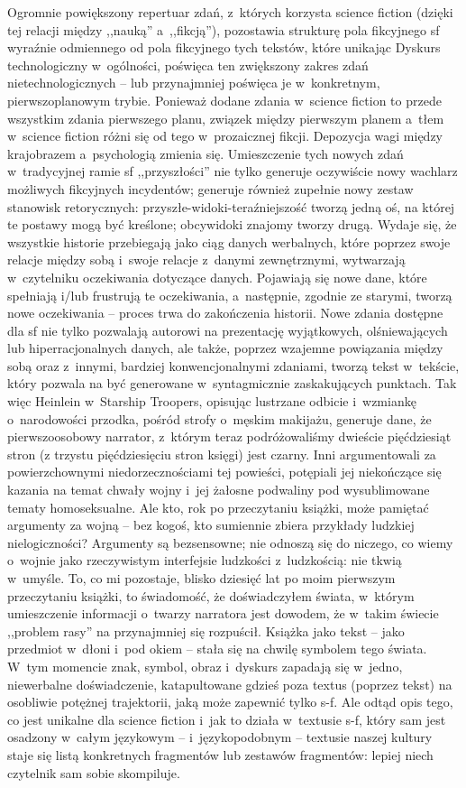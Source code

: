\documentclass[oneside,polish,11pt,rmheadings]{mwbk}
\begin{document}
Ogromnie powiększony repertuar zdań, z~których korzysta science fiction (dzięki tej relacji między ,,nauką'' a~,,fikcją''), pozostawia strukturę pola fikcyjnego sf wyraźnie odmiennego od pola fikcyjnego tych tekstów, które unikając Dyskurs technologiczny w~ogólności, poświęca ten zwiększony zakres zdań nietechnologicznych -- lub przynajmniej poświęca je w~konkretnym, pierwszoplanowym trybie. Ponieważ dodane zdania w~science fiction to przede wszystkim zdania pierwszego planu, związek między pierwszym planem a~tłem w~science fiction różni się od tego w~prozaicznej fikcji. Depozycja wagi między krajobrazem a~psychologią zmienia się. Umieszczenie tych nowych zdań w~tradycyjnej ramie sf ,,przyszłości'' nie tylko generuje oczywiście nowy wachlarz możliwych fikcyjnych incydentów; generuje również zupełnie nowy zestaw stanowisk retorycznych: przyszłe-widoki-teraźniejszość tworzą jedną oś, na której te postawy mogą być kreślone; obcy\dywiz widoki \dywiz znajomy tworzy drugą. Wydaje się, że wszystkie historie przebiegają jako ciąg danych werbalnych, które poprzez swoje relacje między sobą i~swoje relacje z~danymi zewnętrznymi, wytwarzają w~czytelniku oczekiwania dotyczące danych. Pojawiają się nowe dane, które spełniają i/lub frustrują te oczekiwania, a~następnie, zgodnie ze starymi, tworzą nowe oczekiwania -- proces trwa do zakończenia historii. Nowe zdania dostępne dla sf nie tylko pozwalają autorowi na prezentację wyjątkowych, olśniewających lub hiperracjonalnych danych, ale także, poprzez wzajemne powiązania między sobą oraz z~innymi, bardziej konwencjonalnymi zdaniami, tworzą tekst w~tekście, który pozwala na być generowane w~syntagmicznie zaskakujących punktach. Tak więc Heinlein w~Starship Troopers, opisując lustrzane odbicie i~wzmiankę o~narodowości przodka, pośród strofy o~męskim makijażu, generuje dane, że pierwszoosobowy narrator, z~którym teraz podróżowaliśmy dwieście pięćdziesiąt stron (z trzystu pięćdziesięciu stron księgi) jest czarny. Inni argumentowali za powierzchownymi niedorzecznościami tej powieści, potępiali jej niekończące się kazania na temat chwały wojny i~jej żałosne podwaliny pod wysublimowane tematy homoseksualne. Ale kto, rok po przeczytaniu książki, może pamiętać argumenty za wojną -- bez kogoś, kto sumiennie zbiera przykłady ludzkiej nielogiczności? Argumenty są bezsensowne; nie odnoszą się do niczego, co wiemy o~wojnie jako rzeczywistym interfejsie ludzkości z~ludzkością: nie tkwią w~umyśle. To, co mi pozostaje, blisko dziesięć lat po moim pierwszym przeczytaniu książki, to świadomość, że doświadczyłem świata, w~którym umieszczenie informacji o~twarzy narratora jest dowodem, że w~takim świecie ,,problem rasy'' na przynajmniej się rozpuścił. Książka jako tekst -- jako przedmiot w~dłoni i~pod okiem -- stała się na chwilę symbolem tego świata. W~tym momencie znak, symbol, obraz i~dyskurs zapadają się w~jedno, niewerbalne doświadczenie, katapultowane gdzieś poza textus (poprzez tekst) na osobliwie potężnej trajektorii, jaką może zapewnić tylko s-f. Ale odtąd opis tego, co jest unikalne dla science fiction i~jak to działa w~textusie s-f, który sam jest osadzony w~całym językowym -- i~językopodobnym -- textusie naszej kultury staje się listą konkretnych fragmentów lub zestawów fragmentów: lepiej niech czytelnik sam sobie skompiluje. 
\end{document}
